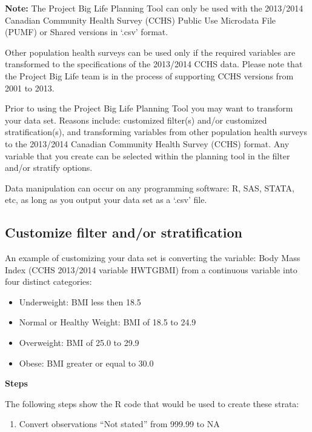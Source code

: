 \documentclass[]{book}
\providecommand{\tightlist}{%
  \setlength{\itemsep}{0pt}\setlength{\parskip}{0pt}}
\begin{document}
\textbf{Note:} The Project Big Life Planning Tool can only be used with the 2013/2014 Canadian Community Health Survey (CCHS) Public Use Microdata File (PUMF) or Shared versions in `.csv' format.

Other population health surveys can be used only if the required variables are transformed to the specifications of the 2013/2014 CCHS data. Please note that the Project Big Life team is in the process of supporting CCHS versions from 2001 to 2013.

Prior to using the Project Big Life Planning Tool you may want to transform your data set. Reasons include: customized filter(s) and/or customized stratification(s), and transforming variables from other population health surveys to the 2013/2014 Canadian Community Health Survey (CCHS) format. Any variable that you create can be selected within the planning tool in the filter and/or stratify options.

Data manipulation can occur on any programming software: R, SAS, STATA, etc, as long as you output your data set as a `.csv' file.

\hypertarget{customize-filter-andor-stratification}{%
\subsection{Customize filter and/or stratification}\label{customize-filter-andor-stratification}}

An example of customizing your data set is converting the variable: Body Mass Index (CCHS 2013/2014 variable HWTGBMI) from a continuous variable into four distinct categories:

\begin{itemize}
\tightlist
\item
  Underweight: BMI less then 18.5
\item
  Normal or Healthy Weight: BMI of 18.5 to 24.9
\item
  Overweight: BMI of 25.0 to 29.9
\item
  Obese: BMI greater or equal to 30.0
\end{itemize}

\textbf{Steps}

The following steps show the R code that would be used to create these strata:

\begin{enumerate}
\def\labelenumi{\arabic{enumi}.}
\tightlist
\item
  Convert observations ``Not stated'' from 999.99 to NA
\end{enumerate}
\end{document}
